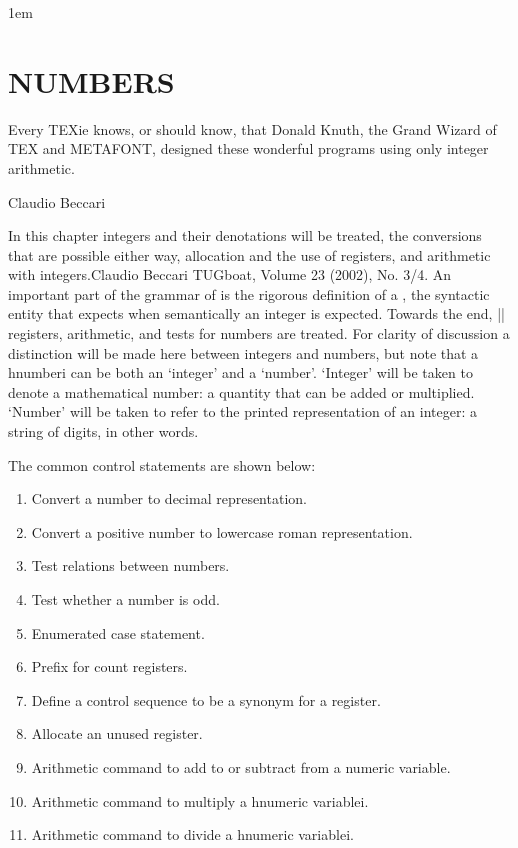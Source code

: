 \parindent1em
\chapter{NUMBERS}
\epigraph{Every TEXie knows, or should know, that Donald
Knuth, the Grand Wizard of TEX and METAFONT,
designed these wonderful programs using only integer
arithmetic.}{Claudio Beccari}

\begin{multicols}{2}
In this chapter integers and their denotations will be treated, the conversions that are possible
either way, allocation and the use of  registers, and arithmetic with integers.Claudio Beccari TUGboat, Volume 23 (2002), No. 3/4. An important part of the grammar of \tex is the rigorous definition of a , the
syntactic entity that \tex expects when semantically an integer is expected.  Towards the end, |\count| registers, arithmetic, and
tests for numbers are treated.
For clarity of discussion a distinction will be made here between integers and numbers,
but note that a hnumberi can be both an ‘integer’ and a ‘number’. ‘Integer’ will be taken
to denote a mathematical number: a quantity that can be added or multiplied. ‘Number’
will be taken to refer to the printed representation of an integer: a string of digits, in other
words.
\end{multicols}

The common control \tex statements  are shown below:

\begin{enumerate}[(1)]
\item{} Convert a number to decimal representation.
\item{}  Convert a positive number to lowercase roman representation.
\item{} Test relations between numbers.
\item{} Test whether a number is odd.
\item{} Enumerated case statement.
\item{} Prefix for count registers.
\item{} Define a control sequence to be a synonym for a  register.
\item{} Allocate an unused  register.
\item{} Arithmetic command to add to or subtract from a numeric variable.
\item{} Arithmetic command to multiply a hnumeric variablei.
\item{} Arithmetic command to divide a hnumeric variablei.
\end{enumerate}



